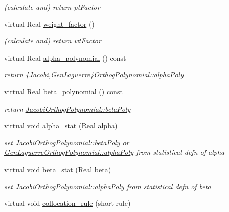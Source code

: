 \begin{DoxyCompactItemize}
\begin{DoxyCompactList}\small\item\em (calculate and) return pt\+Factor \end{DoxyCompactList}\item 
virtual Real \hyperlink{classPecos_1_1BasisPolynomial_acc5475d6b992e443e3cce753a48cfc32}{weight\+\_\+factor} ()\label{classPecos_1_1BasisPolynomial_acc5475d6b992e443e3cce753a48cfc32}

\begin{DoxyCompactList}\small\item\em (calculate and) return wt\+Factor \end{DoxyCompactList}\item 
virtual Real \hyperlink{classPecos_1_1BasisPolynomial_a997bdeddf670667c476513fcacc779ca}{alpha\+\_\+polynomial} () const 
\begin{DoxyCompactList}\small\item\em return \{Jacobi,Gen\+Laguerre\}Orthog\+Polynomial\+::alpha\+Poly \end{DoxyCompactList}\item 
virtual Real \hyperlink{classPecos_1_1BasisPolynomial_a22bfc4209dec76716ef51648e945469a}{beta\+\_\+polynomial} () const 
\begin{DoxyCompactList}\small\item\em return \hyperlink{classPecos_1_1JacobiOrthogPolynomial_a96c0b0201ca445f95be14ec035b595cb}{Jacobi\+Orthog\+Polynomial\+::beta\+Poly} \end{DoxyCompactList}\item 
virtual void \hyperlink{classPecos_1_1BasisPolynomial_aeeb4ce11a8d413209be1ec08eced8728}{alpha\+\_\+stat} (Real alpha)
\begin{DoxyCompactList}\small\item\em set \hyperlink{classPecos_1_1JacobiOrthogPolynomial_a96c0b0201ca445f95be14ec035b595cb}{Jacobi\+Orthog\+Polynomial\+::beta\+Poly} or \hyperlink{classPecos_1_1GenLaguerreOrthogPolynomial_a11666846719189915a02ac6f1f96e393}{Gen\+Laguerre\+Orthog\+Polynomial\+::alpha\+Poly} from statistical defn of alpha \end{DoxyCompactList}\item 
virtual void \hyperlink{classPecos_1_1BasisPolynomial_a7f9584e538ee1574bd4d8d1afb622ed6}{beta\+\_\+stat} (Real beta)
\begin{DoxyCompactList}\small\item\em set \hyperlink{classPecos_1_1JacobiOrthogPolynomial_a11666846719189915a02ac6f1f96e393}{Jacobi\+Orthog\+Polynomial\+::alpha\+Poly} from statistical defn of beta \end{DoxyCompactList}\item 
virtual void \hyperlink{classPecos_1_1BasisPolynomial_addd13d4093ce8cbf2d22c47a47aff610}{collocation\+\_\+rule} (short rule)\label{classPecos_1_1BasisPolynomial_addd13d4093ce8cbf2d22c47a47aff610}


\end{DoxyCompactItemize}
